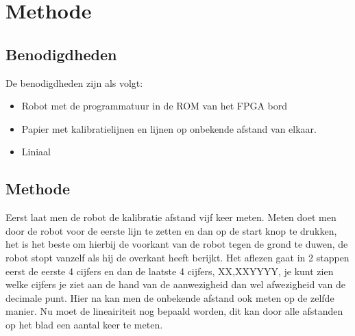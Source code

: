\documentclass[a4paper]{article}
\begin{document}
\section{Methode}
\subsection{Benodigdheden}
De benodigdheden zijn als volgt:
\begin{itemize}
\item Robot met de programmatuur in de ROM van het FPGA bord
\item Papier met kalibratielijnen en lijnen op onbekende afstand van elkaar.
\item Liniaal
\end{itemize}
\subsection{Methode}
Eerst laat men de robot de kalibratie afstand vijf keer meten. Meten doet men door de robot voor de eerste lijn te zetten en dan op de start knop te drukken, het is het beste om hierbij de voorkant van de robot tegen de grond te duwen, de robot stopt vanzelf als hij de overkant heeft berijkt. Het aflezen gaat in 2 stappen eerst de eerste 4 cijfers en dan de laatste 4 cijfers, XX,XXYYYY, je kunt zien welke cijfers je ziet aan de hand van de aanwezigheid dan wel afwezigheid van de decimale punt.
Hier na kan men de onbekende afstand ook meten op de zelfde manier.
Nu moet de lineairiteit nog bepaald worden, dit kan door alle afstanden op het blad een aantal keer te meten.
\end{document}

